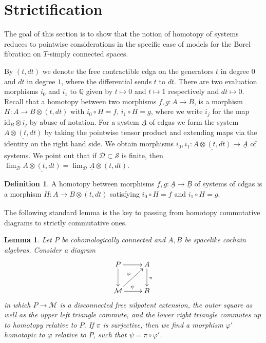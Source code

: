 \documentclass[12pt,a4paper]{article}
\newcommand{\id}{\mathrm{id}}
\newtheorem{lem}[thm]{Lemma}
\theoremstyle{definition}
\newtheorem{defn}[thm]{Definition}
\begin{document}
\section{Strictification}
The goal of this section is to show that the notion of homotopy of systems reduces to pointwise considerations in the specific case of models for the Borel fibration on $T$-simply connected spaces.


By $(t,dt)$ we denote the free contractible cdga on the generators $t$ in degree $0$ and $dt$ in degree $1$, where the differential sends $t$ to $dt$. There are two evaluation morphisms $i_0$ and $i_1$ to $\mathbb{Q}$ given by $t\mapsto 0$ and $t\mapsto 1$ respectively and $dt\mapsto 0$.
Recall that a homotopy between two morphisms $f,g\colon A\rightarrow B$, is a morphism $H\colon A\rightarrow B\otimes (t,dt)$ with $i_0\circ H=f$, $i_1\circ H=g$, where we write $i_j$ for the map $\id_B\otimes i_j$ by abuse of notation. For a system $\underline{A}$ of cdgas we form the system $\underline{A\otimes (t,dt)}$ by taking the pointwise tensor product and extending maps via the identity on the right hand side. We obtain morphisms $i_0,i_1\colon \underline{A\otimes(t,dt)}\rightarrow \underline{A}$ of systems. We point out that if $\mathcal{D}\subset \mathcal{S}$ is finite, then $\lim_{\mathcal{D}}\underline{A\otimes(t,dt)}=\lim_\mathcal{D}\underline{A}\otimes (t,dt)$.

\begin{defn} A homotopy between morphisms $f,g\colon\underline{A}\rightarrow\underline{B}$ of systems of cdgas is a morphism  $H\colon \underline{A}\rightarrow \underline{B\otimes (t,dt)}$ satisfying $i_0\circ H=f$ and $i_1\circ H=g$.
\end{defn}


The following standard lemma is the key to passing from homotopy commutative diagrams to strictly commutative ones.

\begin{lem}\label{lem:homotopetocom}
Let $P$ be cohomologically connected and $A,B$ be spacelike cochain algebras. Consider a diagram
\[\xymatrix{
 P\ar[r]\ar[d]& A\ar[d]^\pi\\
 \mathcal{M}\ar[ur]^\varphi\ar[r]^\psi & B
}\]
in which $P\rightarrow \mathcal{M}$ is a disconnected free nilpotent extension, the outer square as well as the upper left triangle commute, and the lower right triangle commutes up to homotopy relative to $P$. If $\pi$ is surjective, then we find a morphism $\varphi'$ homotopic to $\varphi$ relative to $P$, such that $\psi=\pi\circ\varphi'$.
\end{lem}
\end{document}
